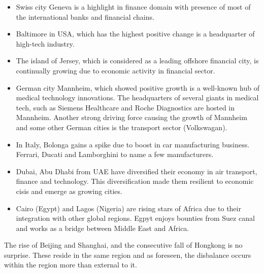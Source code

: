 		\begin{itemize}
			\item Swiss city Geneva is a highlight in finance domain with presence of most of the international banks and financial chains.
			
			\item Baltimore in USA, which has the highest positive change is a headquarter of high-tech industry.
			
			\item The island of Jersey, which is considered as a leading offshore financial city, is continually growing due to economic activity in financial sector.
			
			\item German city Mannheim, which showed positive growth is a well-known hub of medical technology innovations. The headquarters of several giants in medical tech, such as Siemens Healthcare and Roche Diagnostics are hosted in Mannheim. Another strong driving force causing the growth of Mannheim and some other German cities is the transport sector (Volkswagan).
			
			\item In Italy, Bolonga gains a spike due to boost in car manufacturing business. Ferrari, Ducati and Lamborghini to name a few manufacturers.
			
			\item Dubai, Abu Dhabi from UAE have diversified their economy in air transport, finance and technology. This diversification made them resilient to economic cisis and emerge as growing cities.
			
			\item Cairo (Egypt) and Lagos (Nigeria) are rising stars of Africa due to their integration with other global regions. Egpyt enjoys bounties from Suez canal and works as a bridge between Middle East and Africa.
			
		\end{itemize}
		
		The rise of Beijing and Shanghai, and the consecutive fall of Hongkong is no surprise. These reside in the same region and as foreseen, the disbalance occurs within the region more than external to it.
		
